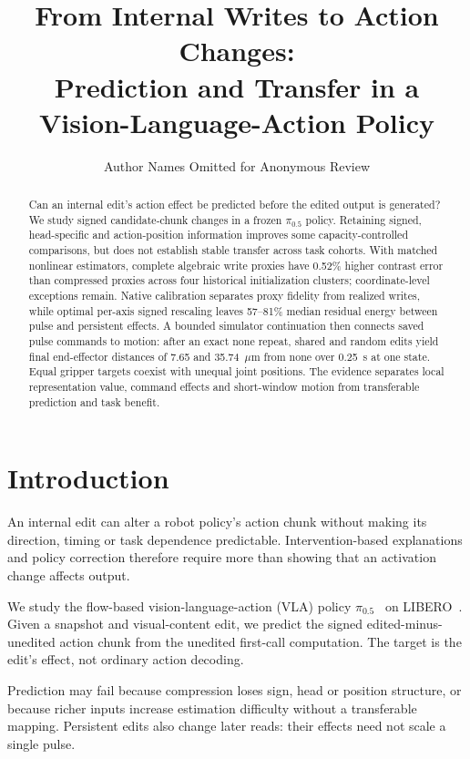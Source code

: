 \documentclass[conference]{IEEEtran}
\begin{document}
\title{From Internal Writes to Action Changes:\\Prediction and Transfer in a Vision-Language-Action Policy}
\author{Author Names Omitted for Anonymous Review}
\maketitle

\begin{abstract}
Can an internal edit's action effect be predicted before the edited output is generated? We study signed candidate-chunk changes in a frozen $\pi_{0.5}$ policy. Retaining signed, head-specific and action-position information improves some capacity-controlled comparisons, but does not establish stable transfer across task cohorts. With matched nonlinear estimators, complete algebraic write proxies have 0.52\% higher contrast error than compressed proxies across four historical initialization clusters; coordinate-level exceptions remain. Native calibration separates proxy fidelity from realized writes, while optimal per-axis signed rescaling leaves 57--81\% median residual energy between pulse and persistent effects. A bounded simulator continuation then connects saved pulse commands to motion: after an exact none repeat, shared and random edits yield final end-effector distances of 7.65 and 35.74~$\mu$m from none over 0.25~s at one state. Equal gripper targets coexist with unequal joint positions. The evidence separates local representation value, command effects and short-window motion from transferable prediction and task benefit.
\end{abstract}
\IEEEpeerreviewmaketitle

\section{Introduction}
An internal edit can alter a robot policy's action chunk without making its direction, timing or task dependence predictable. Intervention-based explanations and policy correction therefore require more than showing that an activation change affects output.

We study the flow-based vision-language-action (VLA) policy $\pi_{0.5}$~\citep{pi05} on LIBERO~\citep{libero}. Given a snapshot and visual-content edit, we predict the signed edited-minus-unedited action chunk from the unedited first-call computation. The target is the edit's effect, not ordinary action decoding.

Prediction may fail because compression loses sign, head or position structure, or because richer inputs increase estimation difficulty without a transferable mapping. Persistent edits also change later reads: their effects need not scale a single pulse.
\end{document}
